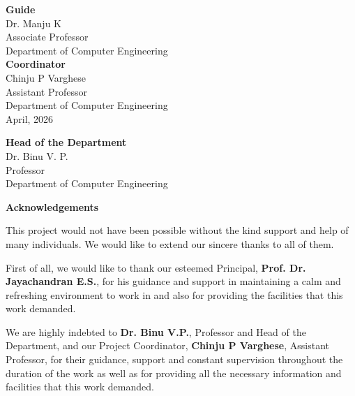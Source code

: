 \documentclass[11pt]{report}
\begin{document}
\noindent
\begin{minipage}[t]{0.48\textwidth}
\vspace{0pt}
\raggedright

\textbf{Guide}\\
Dr. Manju K\\
Associate Professor\\
Department of Computer Engineering\\[1.2cm]

\textbf{Coordinator}\\
Chinju P Varghese\\
Assistant Professor\\
Department of Computer Engineering\\[0.8cm]

April, 2026

\end{minipage}
\hfill
\begin{minipage}[t]{0.48\textwidth}
\vspace{0pt}
\raggedleft

\textbf{Head of the Department}\\
Dr. Binu V. P.\\
Professor\\
Department of Computer Engineering\\[1.2cm]

\end{minipage}

\clearpage
{}
\thispagestyle{empty}

\begin{center}
\textbf{\LARGE Acknowledgements}
\end{center}

\vspace{0.8cm}

This project would not have been possible without the kind support and help of many individuals.
We would like to extend our sincere thanks to all of them.

First of all, we would like to thank our esteemed Principal, \textbf{Prof. Dr. Jayachandran E.S.}, for his
guidance and support in maintaining a calm and refreshing environment to work in and also for
providing the facilities that this work demanded.

We are highly indebted to \textbf{Dr. Binu V.P.}, Professor and Head of the Department,
and our Project Coordinator, \textbf{Chinju P Varghese}, Assistant Professor, for their guidance,
support and constant supervision throughout the duration of the work as well as for providing all
the necessary information and facilities that this work demanded.
\end{document}
